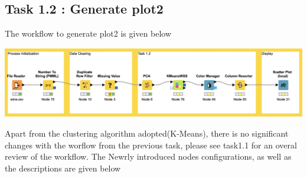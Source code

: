 \documentclass[11pt]{article}
\begin{document}
		\subsection*{Task 1.2 : Generate plot2}
			The workflow to generate plot2 is given below
			\iftrue
			\begin{center}
				\includegraphics[scale=0.35]{res/t1/t12/t12-workflow}
			\end{center}
			\fi
			Apart from the clustering algorithm adopted(K-Means), there is no significant changes with the worflow from the previous task, please see task1.1 for an overal review of the workflow. The Newrly introduced nodes configurations, as well as the descriptions are given below
			
\end{document}
